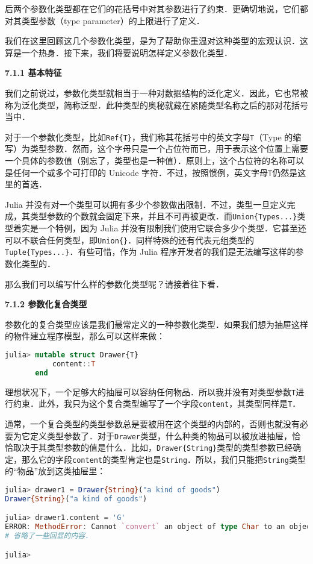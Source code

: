 后两个参数化类型都在它们的花括号中对其参数进行了约束．更确切地说，它们都对其类型参数（type parameter）的上限进行了定义．

我们在这里回顾这几个参数化类型，是为了帮助你重温对这种类型的宏观认识．这算是一个热身．接下来，我们将要说明怎样定义参数化类型．

\textbf{7.1.1 基本特征}

我们之前说过，参数化类型就相当于一种对数据结构的泛化定义．因此，它也常被称为泛化类型，简称泛型．此种类型的奥秘就藏在紧随类型名称之后的那对花括号当中．

对于一个参数化类型，比如\verb|Ref{T}|，我们称其花括号中的英文字母\verb|T|（Type 的缩写）为类型参数．然而，这个字母只是一个占位符而已，用于表示这个位置上需要一个具体的参数值（别忘了，类型也是一种值）．原则上，这个占位符的名称可以是任何一个或多个可打印的 Unicode 字符．不过，按照惯例，英文字母\verb|T|仍然是这里的首选．

Julia 并没有对一个类型可以拥有多少个参数做出限制．不过，类型一旦定义完成，其类型参数的个数就会固定下来，并且不可再被更改．而\verb|Union{Types...}|类型着实是一个特例，因为 Julia 并没有限制我们使用它联合多少个类型．它甚至还可以不联合任何类型，即\verb|Union{}|．同样特殊的还有代表元组类型的\verb|Tuple{Types...}|．有些可惜，作为 Julia 程序开发者的我们是无法编写这样的参数化类型的．

那么我们可以编写什么样的参数化类型呢？请接着往下看．

\textbf{7.1.2 参数化复合类型}

参数化的复合类型应该是我们最常定义的一种参数化类型．如果我们想为抽屉这样的物件建立程序模型，那么可以这样来做：

\begin{lstlisting}[language=julia]
julia> mutable struct Drawer{T}
           content::T
       end 
\end{lstlisting}

理想状况下，一个足够大的抽屉可以容纳任何物品．所以我并没有对类型参数\verb|T|进行约束．此外，我只为这个复合类型编写了一个字段\verb|content|，其类型同样是\verb|T|．

通常，一个复合类型的类型参数总是要被用在这个类型的内部的，否则也就没有必要为它定义类型参数了．对于\verb|Drawer|类型，什么种类的物品可以被放进抽屉，恰恰取决于其类型参数的值是什么．比如，\verb|Drawer{String}|类型的类型参数已经确定，那么它的字段\verb|content|的类型肯定也是\verb|String|．所以，我们只能把\verb|String|类型的“物品”放到这类抽屉里：

\begin{lstlisting}[language=julia]
julia> drawer1 = Drawer{String}("a kind of goods")
Drawer{String}("a kind of goods")

julia> drawer1.content = 'G'
ERROR: MethodError: Cannot `convert` an object of type Char to an object of type String
# 省略了一些回显的内容．

julia> 
\end{lstlisting}

